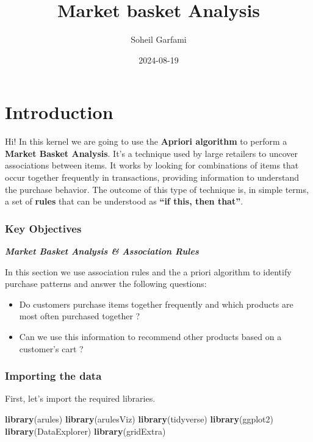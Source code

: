 \documentclass[
]{article}
\title{Market basket Analysis}
\author{Soheil Garfami}
\date{2024-08-19}
\newenvironment{Shaded}{\begin{snugshade}}{\end{snugshade}}
\newcommand{\FunctionTok}[1]{\textcolor[rgb]{0.13,0.29,0.53}{\textbf{#1}}}
\newcommand{\NormalTok}[1]{#1}
\begin{document}
\maketitle

{
\setcounter{tocdepth}{2}
\tableofcontents
}
\section{\texorpdfstring{\textbf{Introduction}}{Introduction}}\label{introduction}

Hi! In this kernel we are going to use the \textbf{Apriori algorithm} to
perform a \textbf{Market Basket Analysis}. It's a technique used by
large retailers to uncover associations between items. It works by
looking for combinations of items that occur together frequently in
transactions, providing information to understand the purchase behavior.
The outcome of this type of technique is, in simple terms, a set of
\textbf{rules} that can be understood as \textbf{``if this, then
that''}.

\subsubsection{Key Objectives}\label{key-objectives}

\textbf{\emph{Market Basket Analysis \& Association Rules}}

In this section we use association rules and the a priori algorithm to
identify purchase patterns and answer the following questions:

\begin{itemize}
\item
  Do customers purchase items together frequently and which products are
  most often purchased together ?
\item
  Can we use this information to recommend other products based on a
  customer's cart ?
\end{itemize}

\subsubsection{Importing the data}\label{importing-the-data}

First, let's import the required libraries.

\begin{Shaded}
\begin{Highlighting}[]
\FunctionTok{library}\NormalTok{(arules)}
\FunctionTok{library}\NormalTok{(arulesViz)}
\FunctionTok{library}\NormalTok{(tidyverse)}
\FunctionTok{library}\NormalTok{(ggplot2)}
\FunctionTok{library}\NormalTok{(DataExplorer)}
\FunctionTok{library}\NormalTok{(gridExtra)}
\end{Highlighting}
\end{Shaded}
\end{document}
